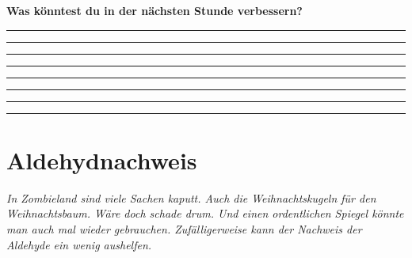 \documentclass{scrartcl}  %
\begin{document}
\begin{center}
\begin{tcolorbox}
\begin{center}
\begin{tikzpicture}[scale=1]
				\end{tikzpicture}
			\end{center}
			\textbf{{\Large Was könntest du in der nächsten Stunde verbessern?}}
			\begin{center}
				\noindent\rule{12cm}{0.2pt}
				\vspace{1.1cm}
				\noindent\rule{12cm}{0.1pt}
				\vspace{1.1cm}
				\noindent\rule{12cm}{0.1pt}
				\vspace{1.1cm}
				\noindent\rule{12cm}{0.1pt}
				\vspace{1.1cm}
				\noindent\rule{12cm}{0.1pt}
				\vspace{1.1cm}
				\noindent\rule{12cm}{0.1pt}
				\vspace{1.1cm}
				\noindent\rule{12cm}{0.1pt}
				\vspace{1.1cm}
				\noindent\rule{12cm}{0.1pt}
			\end{center}
		\end{tcolorbox}
	\end{center}
					
	




\newpage



		\section{Aldehydnachweis}
			\textit{In Zombieland sind viele Sachen kaputt. Auch die Weihnachtskugeln für den Weihnachtsbaum. Wäre doch schade drum. Und einen ordentlichen Spiegel könnte man auch mal wieder gebrauchen. Zufälligerweise kann der Nachweis der Aldehyde ein wenig aushelfen.}
			
\end{document}

